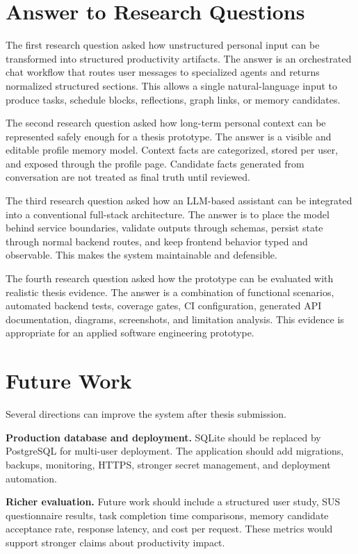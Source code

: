\section{Answer to Research Questions}

The first research question asked how unstructured personal input can be transformed into structured productivity artifacts. The answer is an orchestrated chat workflow that routes user messages to specialized agents and returns normalized structured sections. This allows a single natural-language input to produce tasks, schedule blocks, reflections, graph links, or memory candidates.

The second research question asked how long-term personal context can be represented safely enough for a thesis prototype. The answer is a visible and editable profile memory model. Context facts are categorized, stored per user, and exposed through the profile page. Candidate facts generated from conversation are not treated as final truth until reviewed.

The third research question asked how an LLM-based assistant can be integrated into a conventional full-stack architecture. The answer is to place the model behind service boundaries, validate outputs through schemas, persist state through normal backend routes, and keep frontend behavior typed and observable. This makes the system maintainable and defensible.

The fourth research question asked how the prototype can be evaluated with realistic thesis evidence. The answer is a combination of functional scenarios, automated backend tests, coverage gates, CI configuration, generated API documentation, diagrams, screenshots, and limitation analysis. This evidence is appropriate for an applied software engineering prototype.

\section{Future Work}

Several directions can improve the system after thesis submission.

\textbf{Production database and deployment.} SQLite should be replaced by PostgreSQL for multi-user deployment. The application should add migrations, backups, monitoring, HTTPS, stronger secret management, and deployment automation.

\textbf{Richer evaluation.} Future work should include a structured user study, SUS questionnaire results, task completion time comparisons, memory candidate acceptance rate, response latency, and cost per request. These metrics would support stronger claims about productivity impact.

